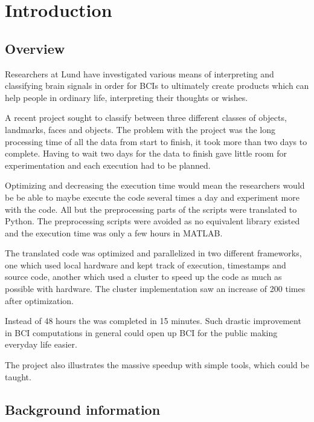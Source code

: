 \documentclass[12pt, a4paper]{article}
\begin{document}
\glsaddall
\printglossary[type=main,style=long,nonumberlist]

\newpage

\section{Introduction}

\subsection{Overview}
Researchers at Lund have investigated various means of interpreting and classifying brain signals in order for BCIs to ultimately create products which can help people in ordinary life, interpreting their thoughts or wishes.

A recent project sought to classify between three different classes of objects, landmarks, faces and objects.
The problem with the project was the long processing time of all the data from start to finish, it took more than two days to complete.
Having to wait two days for the data to finish gave little room for experimentation and each execution had to be planned.

Optimizing and decreasing the execution time would mean the researchers would be be able to maybe execute the code several times a day and experiment more with the code.
All but the preprocessing parts of the scripts were translated to Python.
The preprocessing scripts were avoided as no equivalent library existed and the execution time was only a few hours in MATLAB.

The translated code was optimized and parallelized in two different frameworks, one which used local hardware and kept track of execution, timestamps and source code, another which used a cluster to speed up the code as much as possible with hardware.
The cluster implementation saw an increase of 200 times after optimization.

Instead of 48 hours the was completed in 15 minutes.
Such drastic improvement in BCI computations in general could open up BCI for the public making everyday life easier.

The project also illustrates the massive speedup with simple tools, which could be taught.


\subsection{Background information}
\end{document}
